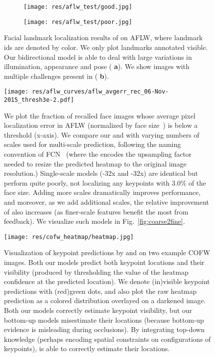 \documentclass[10pt,twocolumn,letterpaper]{article}
\newcommand{\QP}[1]{{}}
\begin{document}
\begin{figure}[t!]
  \centering
  \begin{subfigure}{.75\linewidth}
    \texttt{[image: res/aflw\_test/good.jpg]}
    \caption{}
  \end{subfigure}
  \begin{subfigure}{.195\linewidth}
    \texttt{[image: res/aflw\_test/poor.jpg]}
    \caption{}
  \end{subfigure}
  \caption{Facial landmark localization results of \QP{2} on AFLW,
    where landmark ids are denoted by color. We only plot landmarks
    annotated visible. Our bidirectional model is able to deal with
    large variations in illumination, appearance and pose ({\bf
      a}). We show images with multiple challenges present in ({\bf
      b}).}
  \label{fig:aflw}
\end{figure}





\begin{figure}[t!]
  \centering
\texttt{[image: res/aflw\_curves/aflw\_avgerr\_rec\_06-Nov-2015\_thresh3e-2.pdf]}
\caption{We plot the fraction of recalled face images whose average
    pixel localization error in AFLW (normalized by face
    size~\cite{zhu2012face}) is below a threshold (x-axis). We compare
    our \QP{1} and \QP{2} with varying numbers of scales used for
    multi-scale prediction, following the naming convention of
    FCN~\cite{long2014fully} (where the  encodes the upsampling
    factor needed to resize the predicted heatmap to the original
    image resolution.) Single-scale models (\QP{1}-32x and \QP{2}-32x)
    are identical but perform quite poorly, not localizing any
    keypoints with 3.0\% of the face size. Adding more scales
    dramatically improves performance, and moreover, as we add
    additional scales, the relative improvement of \QP{2} also
    increases (as finer-scale features benefit the most from
    feedback). We visualize such models in Fig.~\ref{fig:coarse2fine}.}
  \label{fig:aflw-curve}
\end{figure}

\begin{figure}[t!]
  \centering
  \texttt{[image: res/cofw\_heatmap/heatmap.jpg]}
  \caption{Visualization of keypoint predictions by \QP{1} and
    \QP{2} on two example COFW images. Both our models predict both
    keypoint locations and their visibility (produced by thresholding
    the value of the heatmap confidence at the predicted location). We
    denote (in)visible keypoint predictions with (red)green dots, and
    also plot the raw heatmap prediction as a colored distribution
    overlayed on a darkened image. Both our models correctly estimate
    keypoint visibility, but our bottom-up models \QP{1} misestimate
    their locations (because bottom-up evidence is misleading during
    occlusions). By integrating top-down knowledge (perhaps encoding
    spatial constraints on configurations of keypoints), \QP{2} is
    able to correctly estimate their locations.}
  \label{fig:cofw-heatmap}
\end{figure}
\end{document}
